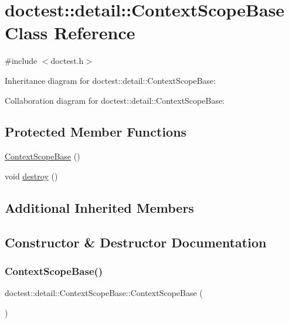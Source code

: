 \hypertarget{classdoctest_1_1detail_1_1ContextScopeBase}{}\section{doctest\+:\+:detail\+:\+:Context\+Scope\+Base Class Reference}
\label{classdoctest_1_1detail_1_1ContextScopeBase}


{\ttfamily \#include $<$doctest.\+h$>$}



Inheritance diagram for doctest\+:\+:detail\+:\+:Context\+Scope\+Base\+:


Collaboration diagram for doctest\+:\+:detail\+:\+:Context\+Scope\+Base\+:
\subsection*{Protected Member Functions}
\begin{DoxyCompactItemize}
\item 
\hyperlink{classdoctest_1_1detail_1_1ContextScopeBase_af3a3ff7ad6b98142ef0f7e1d01912d48}{Context\+Scope\+Base} ()
\item 
void \hyperlink{classdoctest_1_1detail_1_1ContextScopeBase_a6f223de9a972b08bf1b9e9d2d99ab4c6}{destroy} ()
\end{DoxyCompactItemize}
\subsection*{Additional Inherited Members}


\subsection{Constructor \& Destructor Documentation}
\mbox{\label{classdoctest_1_1detail_1_1ContextScopeBase_af3a3ff7ad6b98142ef0f7e1d01912d48}} 
\subsubsection{\texorpdfstring{Context\+Scope\+Base()}{ContextScopeBase()}}
{\footnotesize\ttfamily doctest\+::detail\+::\+Context\+Scope\+Base\+::\+Context\+Scope\+Base (\begin{DoxyParamCaption}{ }\end{DoxyParamCaption})\hspace{0.3cm}{\ttfamily [protected]}}



